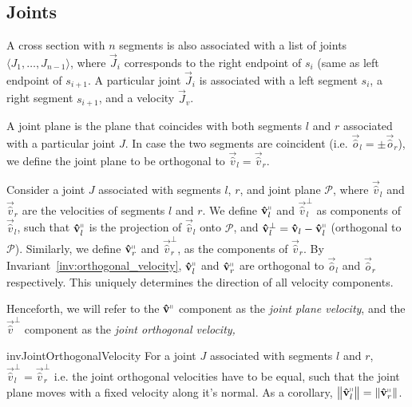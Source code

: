 \subsection{Joints}
\label{sec:joints}

\begin{definition}
\label{def:joints}
A cross section with $n$ segments is also associated with a list of joints
$ \langle J_1,\dots, J_{n-1} \rangle$,
where $\vec J_i$ corresponds to the right endpoint of $s_i$ (same as left endpoint of $s_{i+1}$.
A particular joint $\vec J_i$ is associated with a left segment $s_i$,
a right segment $s_{i+1}$, and a velocity $\vec J_v$.
\end{definition}

\begin{definition}
\label{def:joint_plane}
A joint plane is the plane that coincides with both segments $l$ and $r$ associated with a particular joint $J$.
In case the two segments are coincident (i.e. $\vec{\hat o}_l = \pm \vec{\hat o}_r$),
we define the joint plane to be orthogonal to $\vec{\hat v}_l = \vec{\hat v}_r$.
\end{definition}

\begin{definition}
\label{def:joint_plane_velocity}
Consider a joint $J$ associated with segments $l$, $r$, and joint plane $\mathcal P$,
where $\vec{\hat v}_l$ and $\vec{\hat v}_r$ are the velocities of segments $l$ and $r$.
We define $\vec{\hat v}_l^\shortparallel$ and $\vec{\hat v}_l^\perp$ as components of
$\vec{\hat v}_l$, such that $\vec{\hat v}_l^\shortparallel$ is the projection of $\vec{\hat v}_l$
onto $\mathcal P$, and $\vec{\hat v}_l^\perp = \vec{\hat v}_l - \vec{\hat v}_l^\shortparallel$
(orthogonal to $\mathcal P$).
Similarly, we define $\vec{\hat v}_r^\shortparallel$ and $\vec{\hat v}_r^\perp$, as the components of $\vec{\hat v}_r$.
By Invariant~\ref{inv:orthogonal_velocity}, $\vec{\hat v}_l^\shortparallel$ and $\vec{\hat v}_r^\shortparallel$
are orthogonal to $\vec{\hat o}_l$ and $\vec{\hat o}_r$ respectively.
This uniquely determines the direction of all velocity components.
\end{definition}

Henceforth, we will refer to the $\vec{\hat v}^\shortparallel$ component as the \emph{joint plane velocity},
and the $\vec{\hat v}^\perp$ component as the \emph{joint orthogonal velocity,}

\begin{restatable}{inv}{JointOrthogonalVelocity}
\label{inv:joint_orthogonal_velocity}
For a joint $J$ associated with segments $l$ and $r$, $\vec{\hat v}_l^\perp = \vec{\hat v}_r^\perp$
i.e. the joint orthogonal velocities have to be equal, such that the joint plane moves with a fixed velocity along it's normal.
As a corollary, $ \left\| \vec{\hat v}_l^\shortparallel\right\| = \left\| \vec{\hat v}_r^\shortparallel\right\|$.
\end{restatable}
